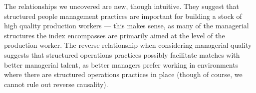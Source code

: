 The relationships we uncovered are new, though intuitive. They suggest that structured people management practices are important for building a stock of high quality production workers --- this makes sense, as many of the managerial structures the index encompasses are primarily aimed at the level of the production worker. The reverse relationship when considering managerial quality suggests that structured operations practices possibly facilitate matches with better managerial talent, as better managers prefer working in environments where there are structured operations practices in place (though of course, we cannot rule out reverse causality).  





















